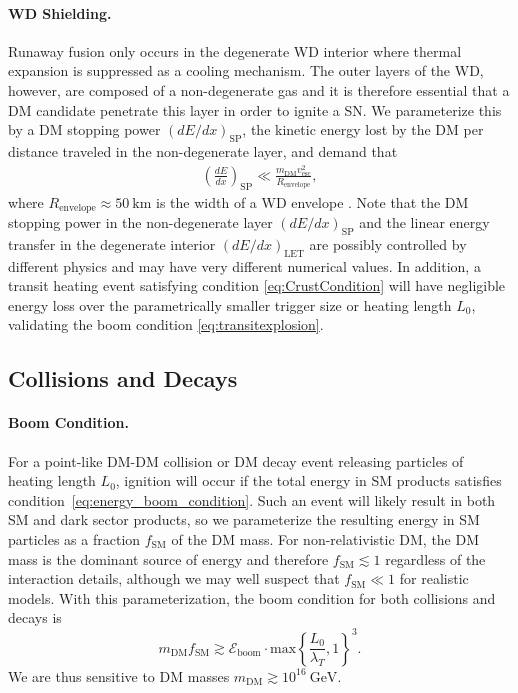 \documentclass[twocolumn, preprintnumbers,amsmath,amssymb,prd, superscriptaddress]{revtex4}
\newcommand{\Eboom}{\mathcal{E}_\text{boom}}
\newcommand{\GeV}{\text{GeV}}
\begin{document}
\paragraph{WD Shielding.}
Runaway fusion only occurs in the degenerate WD interior where thermal expansion is suppressed as a cooling mechanism.
The outer layers of the WD, however, are composed of a non-degenerate gas and it is therefore essential that a DM candidate penetrate this layer in order to ignite a SN.
We parameterize this by a DM stopping power $(dE/dx)_\text{SP}$, the kinetic energy lost by the DM per distance traveled in the non-degenerate layer, and demand that
\begin{align}
\label{eq:CrustCondition}
  \left( \frac{d E}{d x} \right)_\text{SP} \ll
  \frac{m_\text{DM} v^2_\text{esc}}{R_\text{envelope}},
\end{align}
where $R_\text{envelope} \approx 50 ~\text{km}$ is the width of a WD envelope \cite{KippenhahnWeigert}.
Note that the DM stopping power in the non-degenerate layer $(dE/dx)_\text{SP}$ and the linear energy transfer in the degenerate interior $(dE/dx)_\text{LET}$ are possibly controlled by different physics and may have very different numerical values.
In addition, a transit heating event satisfying condition \eqref{eq:CrustCondition} will have negligible energy loss over the parametrically smaller trigger size or heating length $L_0$, validating the boom condition \eqref{eq:transitexplosion}.

\subsection{Collisions and Decays}

\paragraph{Boom Condition.}
For a point-like DM-DM collision or DM decay event releasing particles of heating length $L_0$, ignition will occur if the total energy in SM products satisfies condition~\eqref{eq:energy_boom_condition}.
Such an event will likely result in both SM and dark sector products, so we parameterize the resulting energy in SM particles as a fraction $f_\text{SM}$ of the DM mass.
For non-relativistic DM, the DM mass is the dominant source of energy and therefore $f_\text{SM} \lesssim 1$ regardless of the interaction details, although we may well suspect that $f_\text{SM} \ll 1$ for realistic models.
With this parameterization, the boom condition for both collisions and decays is
\begin{equation}
\label{eq:coldecay}
  m_\text{DM} f_\text{SM}  \gtrsim \Eboom \cdot \text{max} \left \{\frac{L_0}{\lambda_T}, 1 \right \}^3.
\end{equation}
We are thus sensitive to DM masses $m_\text{DM} \gtrsim 10^{16} ~\GeV$.
\end{document}
